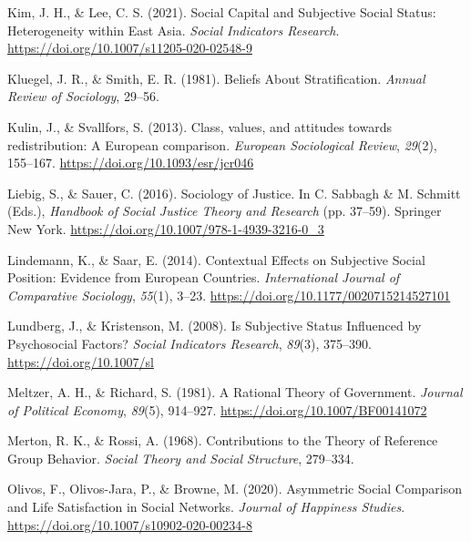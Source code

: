 \documentclass[
  12pt,
]{book}
\newlength{\cslhangindent}
\newlength{\cslentryspacingunit} %
\newenvironment{CSLReferences}[2] %
 {%
  \setlength{\parindent}{0pt}
  \ifodd #1
  \let\oldpar\par
  \def\par{\hangindent=\cslhangindent\oldpar}
  \fi
  \setlength{\parskip}{#2\cslentryspacingunit}
 }%
 {}
\begin{document}
\begin{CSLReferences}{1}{0}
\leavevmode{}%
Kim, J. H., \& Lee, C. S. (2021). Social {Capital} and {Subjective Social Status}: {Heterogeneity} within {East Asia}. \emph{Social Indicators Research}. \url{https://doi.org/10.1007/s11205-020-02548-9}

\leavevmode{}%
Kluegel, J. R., \& Smith, E. R. (1981). Beliefs {About Stratification}. \emph{Annual Review of Sociology}, 29--56.

\leavevmode{}%
Kulin, J., \& Svallfors, S. (2013). Class, values, and attitudes towards redistribution: {A European} comparison. \emph{European Sociological Review}, \emph{29}(2), 155--167. \url{https://doi.org/10.1093/esr/jcr046}

\leavevmode{}%
Liebig, S., \& Sauer, C. (2016). Sociology of {Justice}. In C. Sabbagh \& M. Schmitt (Eds.), \emph{Handbook of {Social Justice Theory} and {Research}} (pp. 37--59). {Springer New York}. \url{https://doi.org/10.1007/978-1-4939-3216-0_3}

\leavevmode{}%
Lindemann, K., \& Saar, E. (2014). Contextual {Effects} on {Subjective Social Position}: {Evidence} from {European Countries}. \emph{International Journal of Comparative Sociology}, \emph{55}(1), 3--23. \url{https://doi.org/10.1177/0020715214527101}

\leavevmode{}%
Lundberg, J., \& Kristenson, M. (2008). Is {Subjective Status Influenced} by {Psychosocial Factors}? \emph{Social Indicators Research}, \emph{89}(3), 375--390. \url{https://doi.org/10.1007/sl}

\leavevmode{}%
Meltzer, A. H., \& Richard, S. (1981). A {Rational Theory} of {Government}. \emph{Journal of Political Economy}, \emph{89}(5), 914--927. \url{https://doi.org/10.1007/BF00141072}

\leavevmode{}%
Merton, R. K., \& Rossi, A. (1968). Contributions to the {Theory} of {Reference Group Behavior}. \emph{Social Theory and Social Structure}, 279--334.

\leavevmode{}%
Olivos, F., Olivos-Jara, P., \& Browne, M. (2020). Asymmetric {Social Comparison} and {Life Satisfaction} in {Social Networks}. \emph{Journal of Happiness Studies}. \url{https://doi.org/10.1007/s10902-020-00234-8}


\end{CSLReferences}
\end{document}
